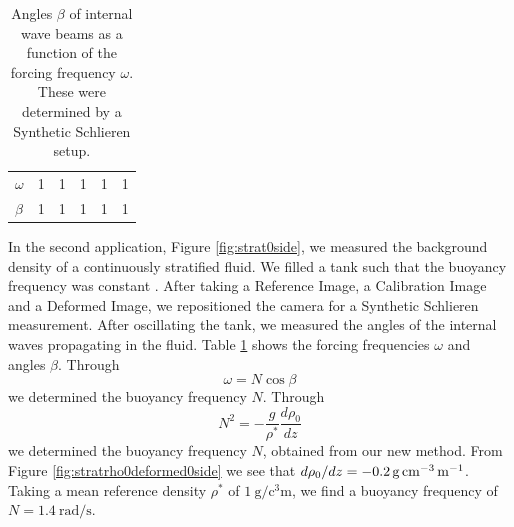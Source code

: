 \documentclass{svjour3}                     %
\begin{document}
\begin{table}[htbp]
\caption{Angles $\beta$ of internal wave beams as a function of the forcing frequency $\omega$. These were determined by a Synthetic Schlieren setup.}
\label{tab:SSintwav}
\centering
\begin{tabular}{llllll}
$\omega$ & 1 & 1 & 1 & 1 & 1  \\
$\beta$  & 1 & 1 & 1 & 1 & 1
\end{tabular}
\end{table}

In the second application, Figure \ref{fig:strat0side}, we measured the background density of a continuously stratified fluid. We filled a tank such that the buoyancy frequency was constant . After taking a Reference Image, a Calibration Image and a Deformed Image, we repositioned the camera for a Synthetic Schlieren measurement. After oscillating the tank, we measured the angles of the internal waves propagating in the fluid. Table \ref{tab:SSintwav} shows the forcing frequencies $\omega$ and angles $\beta$. Through
\begin{equation}
	\omega = N \cos \beta
\end{equation}
we determined the buoyancy frequency $N$. Through
\begin{equation}
	N^2 = - \frac{g}{\rho^*}\frac{d \rho_0}{d z}
\end{equation}
we determined the buoyancy frequency $N$, obtained from our new method. From Figure \ref{fig:stratrho0deformed0side} we see that $d \rho_0 / d z =\SI{ - 0.2}{\gram\per\cubic\centi\metre\per\metre}$. Taking a mean reference density $\rho^*$ of $\SI{1}{\gram\per\cubic\centi\metre}$, we find a buoyancy frequency of $N = \SI{1.4}{\radian\per\second}$.
\end{document}
